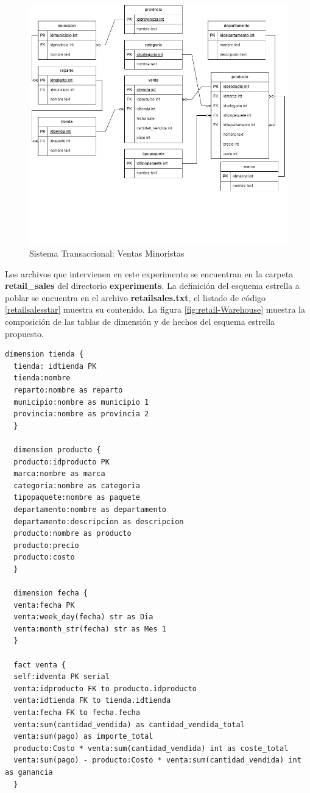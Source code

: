 \begin{figure}[ht]
    \centering
    \includegraphics[scale=0.5]{Graphics/retailSales-Transactional.drawio.png}
    \caption{Sistema Transaccional: Ventas Minoristas}
    \label{fig:retail-transactional}
  \end{figure}

Los archivos que intervienen en este experimento se encuentran en la carpeta \textbf{retail\_sales} del 
directorio \textbf{experiments}. La definición del esquema estrella a poblar se encuentra en el archivo 
\textbf{retailsales.txt}, el listado de c\'odigo \ref{retailsalesstar} muestra su contenido. La figura \ref{fig:retail-Warehouse} muestra la composición de las 
tablas de dimensión y de hechos del esquema estrella propuesto. 

\begin{lstlisting}[label={retailsalesstar}, caption={Definici\'on del esquema estrella del almacén de datos asociado al escenario ventas minoristas}]
  dimension tienda {
  tienda: idtienda PK
  tienda:nombre
  reparto:nombre as reparto
  municipio:nombre as municipio 1
  provincia:nombre as provincia 2
  }

  dimension producto {
  producto:idproducto PK
  marca:nombre as marca
  categoria:nombre as categoria
  tipopaquete:nombre as paquete
  departamento:nombre as departamento
  departamento:descripcion as descripcion
  producto:nombre as producto
  producto:precio
  producto:costo
  }

  dimension fecha {
  venta:fecha PK
  venta:week_day(fecha) str as Dia
  venta:month_str(fecha) str as Mes 1
  }

  fact venta {
  self:idventa PK serial
  venta:idproducto FK to producto.idproducto 
  venta:idtienda FK to tienda.idtienda
  venta:fecha FK to fecha.fecha
  venta:sum(cantidad_vendida) as cantidad_vendida_total
  venta:sum(pago) as importe_total
  producto:Costo * venta:sum(cantidad_vendida) int as coste_total
  venta:sum(pago) - producto:Costo * venta:sum(cantidad_vendida) int as ganancia 
  }
\end{lstlisting}

